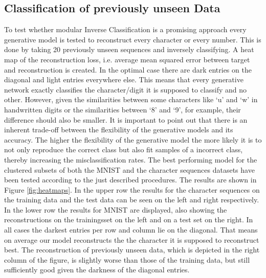 \documentclass{article}
\begin{document}
\subsection{Classification of previously unseen Data}
\label{subsec:classification}

To test whether modular Inverse Classification is a promising approach every generative model is tested to reconstruct every character or every number. This is done by taking 20 previously unseen sequences and inversely classifying. A heat map of the reconstruction loss, i.e. average mean squared error between target and reconstruction is created. In the optimal case there are dark entries on the diagonal and light entries everywhere else. This means that every generative network exactly classifies the character/digit it is supposed to classify and no other. However, given the similarities between some characters like `u' and `w' in handwritten digits or the similarities between `8' and `9', for example, their difference should also be smaller. It is important to point out that there is an inherent trade-off between the flexibility of the generative models and its accuracy. The higher the flexibility of the generative model the more likely it is to not only reproduce the correct class but also fit samples of a incorrect class, thereby increasing the misclassification rates. The best performing model for the clustered subsets of both the MNIST and the character sequences datasets have been tested according to the just described procedures. The results are shown in Figure \ref{fig:heatmaps}. In the upper row the results for the character sequences on the training data and the test data can be seen on the left and right respectively. In the lower row the results for MNIST are displayed, also showing the reconstructions on the trainingsset on the left and on a test set on the right. In all cases the darkest entries per row and column lie on the diagonal. That means on average our model reconstructs the the character it is supposed to reconstruct best. The reconstruction of previously unseen data, which is depicted in the right column of the figure, is slightly worse than those of the training data, but still sufficiently good given the darkness of the diagonal entries. 
\end{document}
